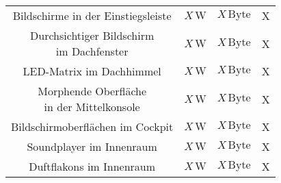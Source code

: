 \begin{table}[hbt]
\begin{tabular}{c|ccc}
		\parbox[t]{0.4\linewidth}{\centering Bildschirme in der Einstiegsleiste} & $ X\,\mathrm{W} $ & $ X\,\mathrm{Byte} $ & X \\
		\parbox[t]{0.4\linewidth}{\centering Durchsichtiger Bildschirm\\im Dachfenster} & $ X\,\mathrm{W} $ & $ X\,\mathrm{Byte} $ & X \\
		LED-Matrix im Dachhimmel & $ X\,\mathrm{W} $ & $ X\,\mathrm{Byte} $ & X \\
		\parbox[t]{0.4\linewidth}{\centering Morphende Oberfläche\\in der Mittelkonsole} & $ X\,\mathrm{W} $ & $ X\,\mathrm{Byte} $ & X \\
		\parbox[t]{0.4\linewidth}{\centering Bildschirmoberflächen im Cockpit} & $ X\,\mathrm{W} $ & $ X\,\mathrm{Byte} $ & X \\
		\parbox[t]{0.4\linewidth}{\centering Soundplayer im Innenraum} & $ X\,\mathrm{W} $ & $ X\,\mathrm{Byte} $ & X \\
		\parbox[t]{0.4\linewidth}{\centering Duftflakons im Innenraum} & $ X\,\mathrm{W} $ & $ X\,\mathrm{Byte} $ & X \\
	\end{tabular} 
\end{table}
